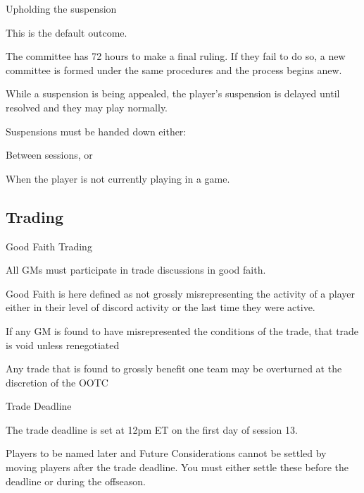 \begin{deepEnumerate}
\begin{deepEnumerate}
\begin{deepEnumerate}
\begin{deepEnumerate}
			\end{deepEnumerate}
			\item Upholding the suspension
			\begin{deepEnumerate}
				\item This is the default outcome.
			\end{deepEnumerate}
		\end{deepEnumerate}
		\item The committee has 72 hours to make a final ruling. If they fail to do so, a new committee is formed under the same procedures and the process begins anew.
		\item While a suspension is being appealed,	the player's suspension is delayed until resolved and they may play normally.
	\end{deepEnumerate}
	\item Suspensions must be handed down either:
	\begin{deepEnumerate}
		\item Between sessions, or
		\item When the player is not currently playing in a game.
	\end{deepEnumerate}
\end{deepEnumerate}

\subsection{Trading}
\begin{deepEnumerate}
	\item Good Faith Trading
	\begin{deepEnumerate}
		\item All GMs must participate in trade discussions in good faith.
			\begin{deepEnumerate}
			\item Good Faith is here defined as not grossly misrepresenting the activity of a player either in their level of discord activity or the last time they were active.
			\end{deepEnumerate}
		\item If any GM is found to have misrepresented the conditions of the trade, that trade is void unless renegotiated
		\item Any trade that is found to grossly benefit one team may be overturned at the discretion of the OOTC 
	\end{deepEnumerate}
	\item Trade Deadline
	\begin{deepEnumerate}
		\item The trade deadline is set at 12pm ET on the first day of session 13.
		\item Players to be named later and Future Considerations cannot be settled by moving players after the trade deadline.
		You must either settle these before the deadline or during the offseason.
	\end{deepEnumerate}
\end{deepEnumerate}

